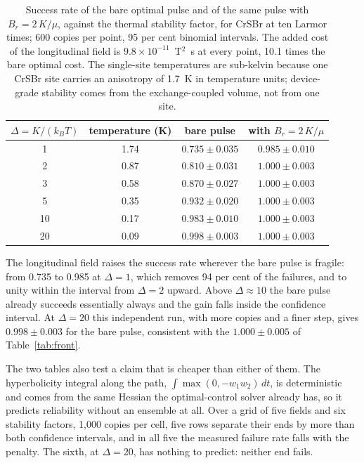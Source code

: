 \documentclass[11pt]{article}
\begin{document}
\begin{table}[h]
\centering
\caption{Success rate of the bare optimal pulse and of the same pulse with $B_r = 2\,K/\mu$, against the
thermal stability factor, for CrSBr at ten Larmor times; 600 copies per point, 95 per cent binomial
intervals. The added cost of the longitudinal field is $9.8\times10^{-11}$~T$^2$~s at every point, 10.1
times the bare optimal cost. The single-site temperatures are sub-kelvin because one CrSBr site carries
an anisotropy of 1.7~K in temperature units; device-grade stability comes from the exchange-coupled
volume, not from one site.}
\label{tab:delta}
\begin{tabular}{cccc}
\toprule
$\Delta = K/(k_B T)$ & temperature (K) & bare pulse & with $B_r = 2\,K/\mu$ \\
\midrule
1 & 1.74 & $0.735 \pm 0.035$ & $0.985 \pm 0.010$ \\
2 & 0.87 & $0.810 \pm 0.031$ & $1.000 \pm 0.003$ \\
3 & 0.58 & $0.870 \pm 0.027$ & $1.000 \pm 0.003$ \\
5 & 0.35 & $0.932 \pm 0.020$ & $1.000 \pm 0.003$ \\
10 & 0.17 & $0.983 \pm 0.010$ & $1.000 \pm 0.003$ \\
20 & 0.09 & $0.998 \pm 0.003$ & $1.000 \pm 0.003$ \\
\bottomrule
\end{tabular}
\end{table}

The longitudinal field raises the success rate wherever the bare pulse is fragile: from 0.735 to 0.985
at $\Delta = 1$, which removes 94 per cent of the failures, and to unity within the interval from
$\Delta = 2$ upward. Above $\Delta \approx 10$ the bare pulse already succeeds essentially always and
the gain falls inside the confidence interval. At $\Delta = 20$ this independent run, with more copies
and a finer step, gives $0.998 \pm 0.003$ for the bare pulse, consistent with the $1.000 \pm 0.005$ of
Table~\ref{tab:front}.

The two tables also test a claim that is cheaper than either of them. The hyperbolicity integral along
the path, $\int \max(0, -w_1 w_2)\,dt$, is deterministic and comes from the same Hessian the
optimal-control solver already has, so it predicts reliability without an ensemble at all. Over a grid
of five fields and six stability factors, 1{,}000 copies per cell, five rows separate their ends by more
than both confidence intervals, and in all five the measured failure rate falls with the penalty. The
sixth, at $\Delta = 20$, has nothing to predict: neither end fails.
\end{document}
